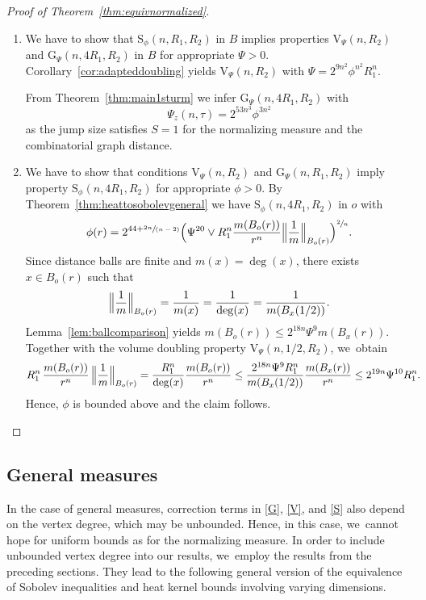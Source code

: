 \documentclass[10pt]{amsart}
\newenvironment{enumeratei}
{\bgroup\def\theenumi{\roman{enumi}}\def\theenumii{\arabic{enumii}}\begin{enumerate}}
{\end{enumerate}\egroup}
\newcommand{\spfrac}[2]{\sfrac{#1}{(#2)}}
\newcommand{\rG}{\mathrm{G}}
\newcommand{\rS}{\mathrm{S}}
\newcommand{\rV}{\mathrm{V}}
\theoremstyle{plain}
\theoremstyle{definition}
\begin{document}
\skpt
\begin{proof}[Proof of Theorem~\ref{thm:equivnormalized}]
\begin{enumeratei}
\item
We have to show that $\rS_{\phi}(n,R_1,R_2)$ in $B$ implies properties $\rV_{{\Psi}}(n,R_2)$ and $\rG_{\Psi}(n,4R_1,R_2)$ in $B$ for appropriate $\Psi>0$.
Corollary~\ref{cor:adapteddoubling} yields $\rV_{{\Psi}}(n,R_2)$ with ${{\Psi}}=2^{{9}n^2}\phi^{n^2} R_1^n$.

From Theorem~\ref{thm:main1sturm} we infer $\rG_\Psi(n,4R_1,R_2)$ with
\[
\Psi_z(n,\tau)=2^{53n^3}\phi
^{3n^2}
\]
as the jump size satisfies $ S=1 $ for the normalizing measure and the combinatorial graph distance.

\item
We have to show that conditions $\rV_{{{\Psi}}}(n,R_2)$ and $\rG_{\Psi}(n,R_1,R_2)$ imply property $\rS_{\phi}(n,4R_1,R_2)$ for appropriate $\phi>0$. By Theorem~\ref{thm:heattosobolevgeneral} we have $\rS_{\phi}(n,4R_1,R_2)$ in $o$ with
\[
\phi(r)=2^{44+\spfrac{2n}{n-2}}\Bigl({\Psi^{20}}\vee R_1^{n}\frac{m(B_o(r))}{r^{n}}\Bigl\|\frac{1}{m}\Bigr\|_{B_o(r)}\Bigr)^{\sfrac{2}{n}}.
\]
Since distance balls are finite and $m(x)=\deg(x)$, there exists $x\in B_o(r)$ such that
\[
\Bigl\|\frac{1}{m}\Bigr\|_{B_o(r)}=\frac{1}{m(x)}=\frac{1}{\deg(x)}=\frac{1}{m(B_x(1/2))}.
\]
Lemma~\ref{lem:ballcomparison} yields $m(B_o(r))\leq 2^{18n}{{\Psi^9}}m(B_x(r))$. Together with the volume doubling property $\rV_{{\Psi}}(n,1/2,R_2)$, we~obtain
\begin{align*}
R_1^{n}\,\frac{m(B_{o}(r))}{r^{n}}\,\Bigl\|\frac{1}{m}\Bigr\|_{B_o(r)}
=\frac{R_1^{n}}{\deg(x)}\frac{m(B_{o}(r))}{r^{n}}
\leq \frac{2^{18n}{{\Psi^9}} R_1^{n}}{m(B_x(1/2))}\frac{m(B_{x}(r))}{r^{n}}
&\leq 2^{19n}{{\Psi^{10}}}R_1^n.
\end{align*}
Hence, $\phi$ is bounded above and the claim follows.\qedhere
\end{enumeratei}
\end{proof}

\subsection*{{General measures}}
In the case of general measures, correction terms in \eqref{G}, \eqref{V}, and \eqref{S} also depend on the vertex degree, which may be unbounded.
{Hence, in this case, we~cannot hope for uniform bounds as for the normalizing measure.
} In order to include unbounded vertex degree into our results, we~employ the results from the preceding sections. They lead to the following general version of the equivalence of Sobolev inequalities and heat kernel bounds involving varying dimensions.
\end{document}
